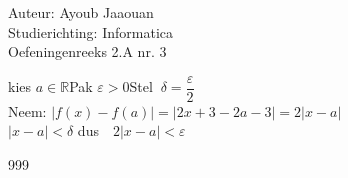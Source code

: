 \documentclass[a4paper]{article}
\begin{document}
  
\noindent \large Auteur: Ayoub Jaaouan          \\
\noindent \large Studierichting: Informatica   \\ 
\noindent \large Oefeningenreeks 2.A nr. 3   \\

\medskip

\normalsize



kies $a\in\mathbb{R}$\quad Pak $\varepsilon > 0$\quad Stel $\ \delta = \dfrac{\varepsilon}{2}$\\

Neem: $|f(x)-f(a)|=|2x+3-2a-3|=2|x-a|$\\

$ |x-a|<\delta$ dus$\quad2|x-a|<\varepsilon $




\begin{thebibliography}{999}
\end{thebibliography}
\end{document}

